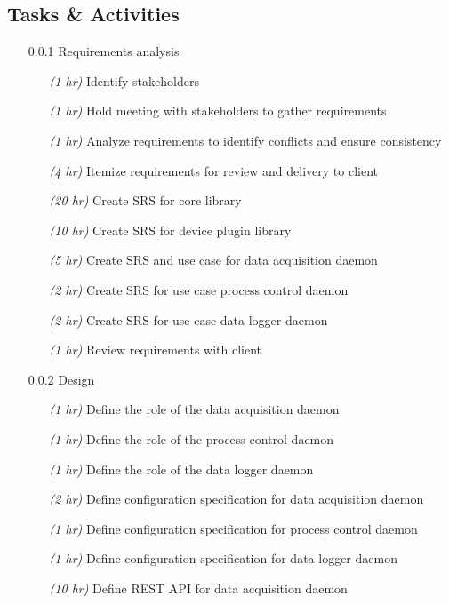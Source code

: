   \subsection{Tasks \& Activities}\label{sec:timeline-tasks}

    \begin{itemize}
      \item[0.0.1] Requirements analysis
        \begin{itemize}
          \item[\emph{(1 hr)}] Identify stakeholders
          \item[\emph{(1 hr)}] Hold meeting with stakeholders to gather requirements
          \item[\emph{(1 hr)}] Analyze requirements to identify conflicts and ensure consistency
          \item[\emph{(4 hr)}] Itemize requirements for review and delivery to client
          \item[\emph{(20 hr)}] Create SRS for core library
          \item[\emph{(10 hr)}] Create SRS for device plugin library
          \item[\emph{(5 hr)}] Create SRS and use case for data acquisition daemon
          \item[\emph{(2 hr)}] Create SRS for use case process control daemon
          \item[\emph{(2 hr)}] Create SRS for use case data logger daemon
          \item[\emph{(1 hr)}] Review requirements with client
        \end{itemize}
      \item[0.0.2] Design
        \begin{itemize}
          \item[\emph{(1 hr)}] Define the role of the data acquisition daemon
          \item[\emph{(1 hr)}] Define the role of the process control daemon
          \item[\emph{(1 hr)}] Define the role of the data logger daemon
          \item[\emph{(2 hr)}] Define configuration specification for data acquisition daemon
          \item[\emph{(1 hr)}] Define configuration specification for process control daemon
          \item[\emph{(1 hr)}] Define configuration specification for data logger daemon
          \item[\emph{(10 hr)}] Define REST API for data acquisition daemon

\end{itemize}
\end{itemize}

